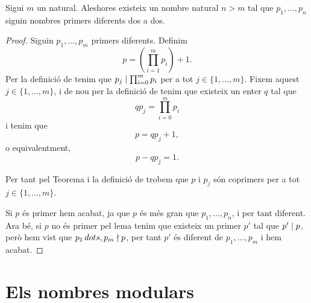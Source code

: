 \documentclass[../../Main.tex]{subfiles}
\begin{document}
	\begin{theorem}
		\label{thm:Teorema d'Euclides}
		Sigui \(m\) un natural. Aleshores existeix un nombre natural \(n>m\) tal que \(p_{1},\dots,p_{n}\) siguin nombres primers diferents dos a dos.
		\begin{proof}
			Siguin \(p_{1},\dots,p_{m}\) primers diferents. Definim
			\[p=\left(\prod_{i=1}^{m}p_{i}\right)+1.\]
			Per la definició de  tenim que \(p_{j}\mathrel{|}\prod_{i=0}^{m}p_{i}\) per a tot \(j\in\{1,\dots,m\}\). Fixem aquest \(j\in\{1,\dots,m\}\), i de nou per la definició de  tenim que existeix un enter \(q\) tal que
			\[qp_{j}=\prod_{i=0}^{m}p_{i}\]
			i tenim que
			\[p=qp_{j}+1,\]
			o equivalentment,
			\[p-qp_{j}=1.\]
			
			Per tant pel Teorema  i la definició de  trobem que \(p\) i \(p_{j}\) són coprimers per a tot \(j\in\{1,\dots,m\}\).
			
			Si \(p\) és primer hem acabat, ja que \(p\) és més gran que \(p_{1},\dots,p_{n}\), i per tant diferent. Ara bé, si \(p\) no és primer pel lema  tenim que existeix un primer \(p'\) tal que \(p'\mathrel{|} p\), però hem vist que \(p_{1}\,dots,p_{m}\mathrel{\nmid} p\), per tant \(p'\) és diferent de \(p_{1},\dots,p_{m}\) i hem acabat.
		\end{proof}
	\end{theorem}
\section{Els nombres modulars}
\end{document}
